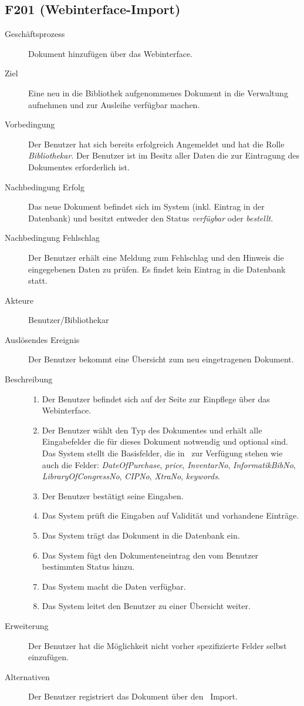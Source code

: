 \subsection{F201 (Webinterface-Import)}
\label{F:Web-Import}
\begin{description}
  \item[Geschäftsprozess]Dokument hinzufügen über das Webinterface.
  \item[Ziel]Eine neu in die Bibliothek aufgenommenes Dokument in die Verwaltung aufnehmen und zur Ausleihe verfügbar machen.
  \item[Vorbedingung]Der Benutzer hat sich bereits erfolgreich Angemeldet und hat die Rolle \emph{Bibliothekar}. Der Benutzer ist im Besitz aller Daten die zur Eintragung des Dokumentes erforderlich ist.
  \item[Nachbedingung Erfolg]Das neue Dokument befindet sich im System (inkl. Eintrag in der Datenbank) und besitzt entweder den Status \emph{verfügbar} oder \emph{bestellt}.
  \item[Nachbedingung Fehlschlag]Der Benutzer erhält eine Meldung zum Fehlschlag und den Hinweis die eingegebenen Daten zu prüfen. Es findet kein Eintrag in die Datenbank statt.
  \item[Akteure]Benutzer/Bibliothekar
  \item[Auslösendes Ereignis]Der Benutzer bekommt eine Übersicht zum neu eingetragenen Dokument.
  \item[Beschreibung]\hfill
    \begin{enumerate}
      \item Der Benutzer befindet sich auf der Seite zur Einpflege über das Webinterface.
      \item Der Benutzer wählt den Typ des Dokumentes und erhält alle Eingabefelder die für dieses Dokument notwendig und optional sind. Das System stellt die Basisfelder, die in \BibTeX\ zur Verfügung stehen wie auch die Felder: \emph{DateOfPurchase}, \emph{price}, \emph{InventarNo}, \emph{InformatikBibNo}, \emph{LibraryOfCongressNo}, \emph{CIPNo}, \emph{XtraNo}, \emph{keywords}.
      \item Der Benutzer bestätigt seine Eingaben.
      \item Das System prüft die Eingaben auf Validität und vorhandene Einträge.
      \item Das System trägt das Dokument in die Datenbank ein.
      \item Das System fügt den Dokumenteneintrag den vom Benutzer bestimmten Status hinzu.
      \item Das System macht die Daten verfügbar.
      \item Das System leitet den Benutzer zu einer Übersicht weiter.
    \end{enumerate}
  \item[Erweiterung]Der Benutzer hat die Möglichkeit nicht vorher spezifizierte Felder selbst einzufügen.
  \item[Alternativen]Der Benutzer registriert das Dokument über den \BibTeX\ Import.
\end{description}

